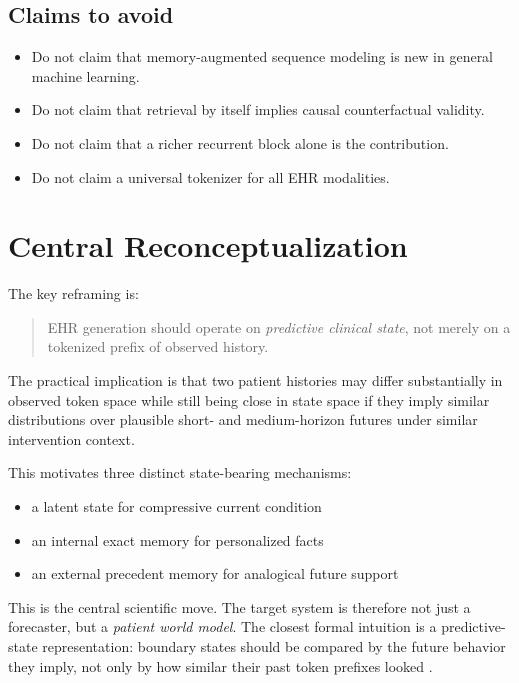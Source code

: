 \documentclass[11pt]{article}
\begin{document}
\subsection{Claims to avoid}

\begin{itemize}
    \item Do not claim that memory-augmented sequence modeling is new in general machine learning.
    \item Do not claim that retrieval by itself implies causal counterfactual validity.
    \item Do not claim that a richer recurrent block alone is the contribution.
    \item Do not claim a universal tokenizer for all EHR modalities.
\end{itemize}

\section{Central Reconceptualization}

The key reframing is:
\begin{quote}
EHR generation should operate on \emph{predictive clinical state}, not merely
on a tokenized prefix of observed history.
\end{quote}

The practical implication is that two patient histories may differ substantially
in observed token space while still being close in state space if they imply
similar distributions over plausible short- and medium-horizon futures under
similar intervention context.

This motivates three distinct state-bearing mechanisms:
\begin{itemize}
    \item a latent state for compressive current condition
    \item an internal exact memory for personalized facts
    \item an external precedent memory for analogical future support
\end{itemize}

This is the central scientific move. The target system is therefore not just a
forecaster, but a \emph{patient world model}. The closest formal intuition is a
predictive-state representation: boundary states should be compared by the
future behavior they imply, not only by how similar their past token prefixes
looked \cite{littman2001psr}.
\end{document}
